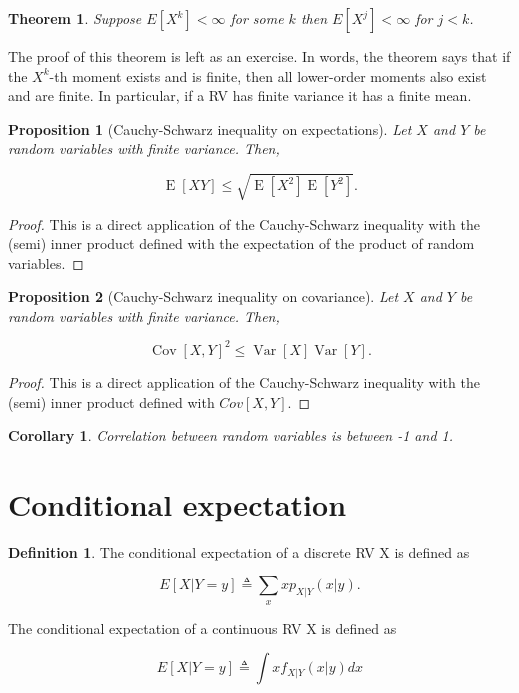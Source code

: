 \documentclass{book}
\theoremstyle{plain}%
\newtheorem{theorem}{Theorem}[section]
\newtheorem{corollary}{Corollary}[section]
\newtheorem{proposition}{Proposition}[section]
\theoremstyle{definition}
\newtheorem{definition}{Definition}[section]
\DeclareMathOperator{\Var}{Var}
\DeclareMathOperator{\Cov}{Cov}
\DeclareMathOperator{\E}{E}
\begin{document}
\begin{theorem} Suppose $E[X^k] < \infty$ for some $k$ then $E[X^j] < \infty$ for $j < k$.\label{thm:moments}
\end{theorem}

The proof of this theorem is left as an exercise. In words, the theorem says that if the $X^k$-th moment exists and is finite, then all lower-order moments also exist and are finite. In particular, if a RV has finite variance it has a finite mean.

\begin{proposition}[Cauchy-Schwarz inequality on expectations]
Let $X$ and $Y$ be random variables with finite variance. Then,

$$\E[XY] \leq \sqrt{\E[X^2]\E[Y^2]}.$$
\end{proposition}

\begin{proof}
This is a direct application of the Cauchy-Schwarz inequality with the (semi) inner product defined with the expectation of the product of random variables.
\end{proof}

\begin{proposition}[Cauchy-Schwarz inequality on covariance]
Let $X$ and $Y$ be random variables with finite variance. Then,

$$\Cov[X,Y]^2 \leq \Var[X]\Var[Y].$$
\end{proposition}

\begin{proof}
This is a direct application of the Cauchy-Schwarz inequality with the (semi) inner product defined with $Cov[X,Y]$.
\end{proof}

\begin{corollary}
Correlation between random variables is between -1 and 1.
\end{corollary}

\section{Conditional expectation}

\begin{definition}
The conditional expectation of a discrete RV X is defined as

$$E[X|Y = y] \triangleq \sum_x x p_{X|Y}(x|y).$$

The conditional expectation of a continuous RV X is defined as

$$E[X|Y = y] \triangleq \int x f_{X|Y}(x|y)dx$$
\end{definition}
\end{document}
